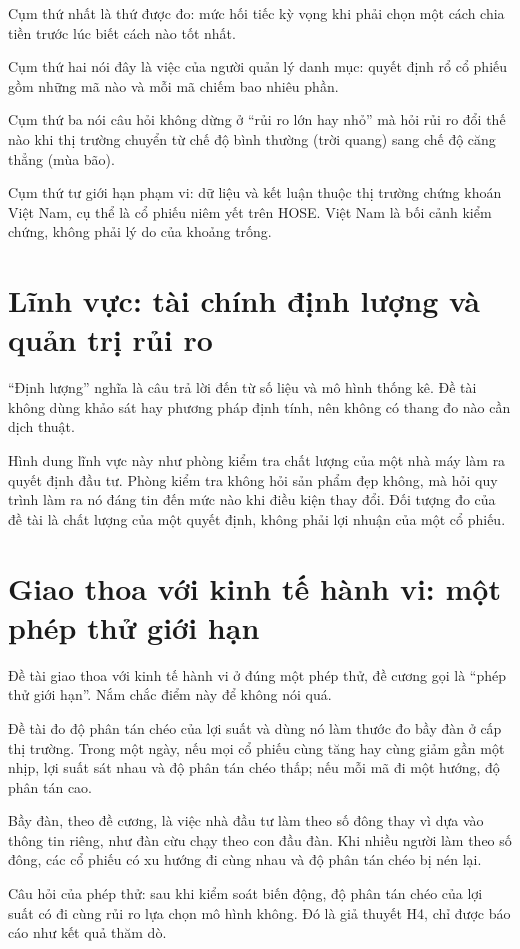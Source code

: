 Cụm thứ nhất là thứ được đo: mức hối tiếc kỳ vọng khi phải chọn một cách chia tiền trước lúc biết cách nào tốt nhất.

Cụm thứ hai nói đây là việc của người quản lý danh mục: quyết định rổ cổ phiếu gồm những mã nào và mỗi mã chiếm bao nhiêu phần.

Cụm thứ ba nói câu hỏi không dừng ở “rủi ro lớn hay nhỏ” mà hỏi rủi ro đổi thế nào khi thị trường chuyển từ chế độ bình thường (trời quang) sang chế độ căng thẳng (mùa bão).

Cụm thứ tư giới hạn phạm vi: dữ liệu và kết luận thuộc thị trường chứng khoán Việt Nam, cụ thể là cổ phiếu niêm yết trên HOSE. Việt Nam là bối cảnh kiểm chứng, không phải lý do của khoảng trống.

\section{Lĩnh vực: tài chính định lượng và quản trị rủi ro}

“Định lượng” nghĩa là câu trả lời đến từ số liệu và mô hình thống kê. Đề tài không dùng khảo sát hay phương pháp định tính, nên không có thang đo nào cần dịch thuật.

Hình dung lĩnh vực này như phòng kiểm tra chất lượng của một nhà máy làm ra quyết định đầu tư. Phòng kiểm tra không hỏi sản phẩm đẹp không, mà hỏi quy trình làm ra nó đáng tin đến mức nào khi điều kiện thay đổi. Đối tượng đo của đề tài là chất lượng của một quyết định, không phải lợi nhuận của một cổ phiếu.

\section{Giao thoa với kinh tế hành vi: một phép thử giới hạn}

Đề tài giao thoa với kinh tế hành vi ở đúng một phép thử, đề cương gọi là “phép thử giới hạn”. Nắm chắc điểm này để không nói quá.

Đề tài đo độ phân tán chéo của lợi suất và dùng nó làm thước đo bầy đàn ở cấp thị trường. Trong một ngày, nếu mọi cổ phiếu cùng tăng hay cùng giảm gần một nhịp, lợi suất sát nhau và độ phân tán chéo thấp; nếu mỗi mã đi một hướng, độ phân tán cao.

Bầy đàn, theo đề cương, là việc nhà đầu tư làm theo số đông thay vì dựa vào thông tin riêng, như đàn cừu chạy theo con đầu đàn. Khi nhiều người làm theo số đông, các cổ phiếu có xu hướng đi cùng nhau và độ phân tán chéo bị nén lại.

Câu hỏi của phép thử: sau khi kiểm soát biến động, độ phân tán chéo của lợi suất có đi cùng rủi ro lựa chọn mô hình không. Đó là giả thuyết H4, chỉ được báo cáo như kết quả thăm dò.

